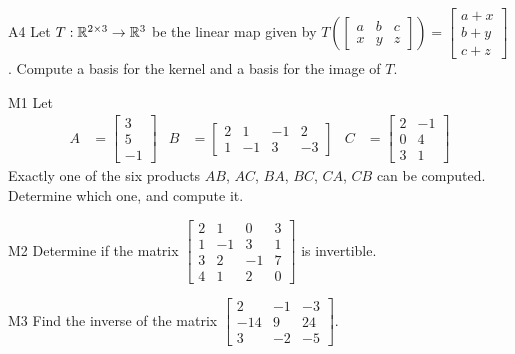 \documentclass{sbgLAexam}
\begin{document}
\begin{problem}{A4}
Let $T: \mathbb{R}^{2\times 3} \rightarrow \mathbb{R}^3$ be the linear map given by \(
  T\left(\begin{bmatrix} a & b & c \\ x & y & z \end{bmatrix} \right) =
  \begin{bmatrix}
    a+x \\ b+y \\ c+z
  \end{bmatrix}
\). Compute a basis for the kernel and a basis for the image of $T$.
\end{problem}
\newpage

\begin{problem}{M1}
Let
\begin{align*}
A &= \begin{bmatrix} 3 \\ 5 \\ -1  \end{bmatrix} & B&=\begin{bmatrix}  2 & 1 & -1 & 2 \\ 1 & -1 & 3 & -3  \end{bmatrix} & C &= \begin{bmatrix} 2 & -1 \\ 0 & 4 \\ 3 & 1 \end{bmatrix} \end{align*}
Exactly one of the six products $AB$, $AC$, $BA$, $BC$, $CA$, $CB$ can be computed.  Determine which one, and compute it.
\end{problem}

\begin{problem}{M2}
Determine if the matrix $\begin{bmatrix} 2 & 1 & 0 & 3 \\ 1 & -1 & 3 & 1 \\ 3 & 2 & -1 & 7 \\ 4 & 1 & 2 & 0 \end{bmatrix}$ is invertible.
\end{problem}
\newpage

\begin{problem}{M3}
  Find the inverse of the matrix
  \(\begin{bmatrix}
    2 & -1 & -3  \\
    -14 & 9 & 24  \\
    3 & -2 & -5
  \end{bmatrix}\).
\end{problem}
\end{document}
